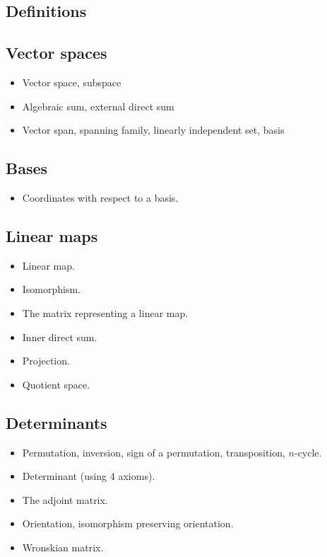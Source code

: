 \documentclass[12pt]{article}
\begin{document}
\begin{multicols}{2}

\section{Definitions}

\subsection{Vector spaces}

\begin{itemize}
    \item Vector space, subspace
    \item Algebraic sum, external direct sum
    \item Vector span, spanning family, linearly independent set, basis
\end{itemize}


\subsection{Bases}

\begin{itemize}
    \item Coordinates with respect to a basis.
\end{itemize}


\subsection{Linear maps}

\begin{itemize}
    \item Linear map.
    \item Isomorphism.
    \item The matrix representing a linear map.
    \item Inner direct sum.
    \item Projection.
    \item Quotient space.
\end{itemize}


\subsection{Determinants}

\begin{itemize}
    \item Permutation, inversion, sign of a permutation,
        transposition, $n$-cycle.
    \item Determinant (using 4 axioms).
    \item The adjoint matrix.
    \item Orientation, isomorphism preserving orientation.
    \item Wronskian matrix.
\end{itemize}



\end{multicols}
\end{document}
